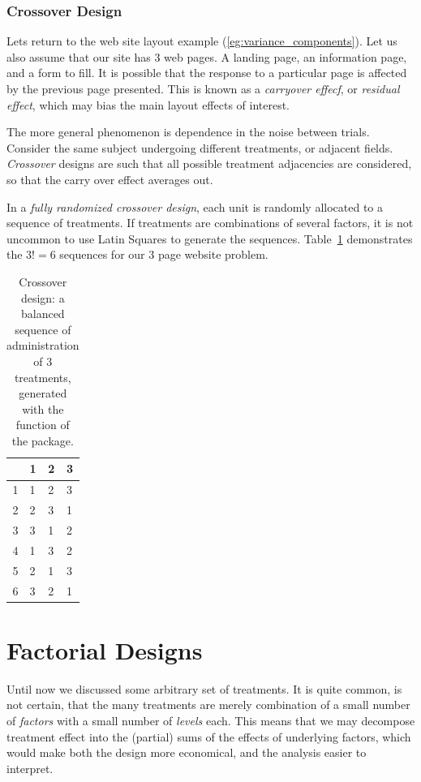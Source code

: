 \subsubsection{Crossover Design}
\label{sec:crossover}
Lets return to the web site layout example (\ref{eg:variance_components}).
Let us also assume that our site has $3$ web pages. A landing page, an information page, and a form to fill. 
It is possible that the response to a particular page is affected by the previous page presented. 
This is known as a \emph{carryover effecf}, or \emph{residual effect}, which may bias the main layout effects of interest. 

The more general phenomenon is dependence in the noise between trials. 
Consider the same subject undergoing different treatments, or adjacent fields. 
\emph{Crossover} designs are such that all possible treatment adjacencies are considered, so that the carry over effect averages out. 

In a \emph{fully randomized crossover design}, each unit is randomly allocated to a sequence of treatments.
If treatments are combinations of several factors, it is not uncommon to use Latin Squares to generate the sequences. Table~\ref{tab:crossover} demonstrates the $3!=6$ sequences for our $3$ page website problem.
\begin{table}[ht]
\centering
\begin{tabular}{rlll}
  \hline
 & 1 & 2 & 3 \\ 
  \hline
1 & 1 & 2 & 3 \\ 
  2 & 2 & 3 & 1 \\ 
  3 & 3 & 1 & 2 \\ 
  4 & 1 & 3 & 2 \\ 
  5 & 2 & 1 & 3 \\ 
  6 & 3 & 2 & 1 \\ 
   \hline
\end{tabular}
\caption[Crossover Design]{Crossover design: a balanced sequence of administration of $3$ treatments, generated with the  function of the  \R package. }
\label{tab:crossover}
\end{table}






\section{Factorial Designs}
Until now we discussed some arbitrary set of treatments.
It is quite common, is not certain, that the many treatments are merely combination of a small number of \emph{factors} with a small number of \emph{levels} each.
This means that we may decompose treatment effect into the (partial) sums of the effects of underlying factors, which would make both the design more economical, and the analysis easier to interpret.

